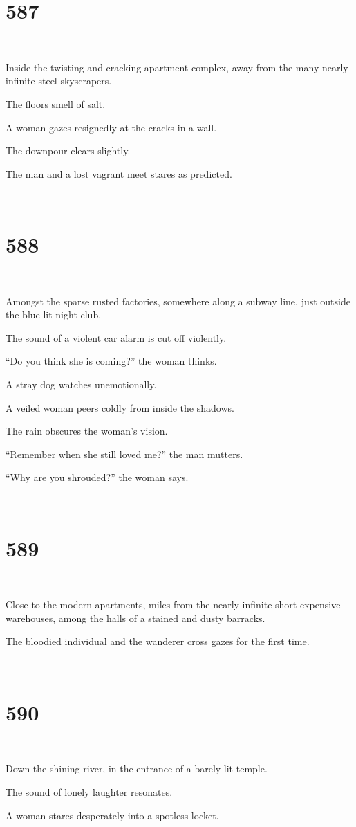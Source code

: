 \documentclass{report}
\begin{document}
\chapter*{587}
~

Inside the twisting and cracking apartment complex, away from the many nearly infinite steel skyscrapers.

The floors smell of salt.

A woman gazes resignedly at the cracks in a wall.

The downpour clears slightly.

The man and a lost vagrant meet stares as predicted.

~
\chapter*{588}
~

Amongst the sparse rusted factories, somewhere along a subway line, just outside the blue lit night club.

The sound of a violent car alarm is cut off violently.

``Do you think she is coming?'' the woman thinks.

A stray dog watches unemotionally.

A veiled woman peers coldly from inside the shadows.

The rain obscures the woman's vision.

``Remember when she still loved me?'' the man mutters.

``Why are you shrouded?'' the woman says.

~
\chapter*{589}
~

Close to the modern apartments, miles from the nearly infinite short expensive warehouses, among the halls of a stained and dusty barracks.

The bloodied individual and the wanderer cross gazes for the first time.

~
\chapter*{590}
~

Down the shining river, in the entrance of a barely lit temple.

The sound of lonely laughter resonates.

A woman stares desperately into a spotless locket.
\end{document}
